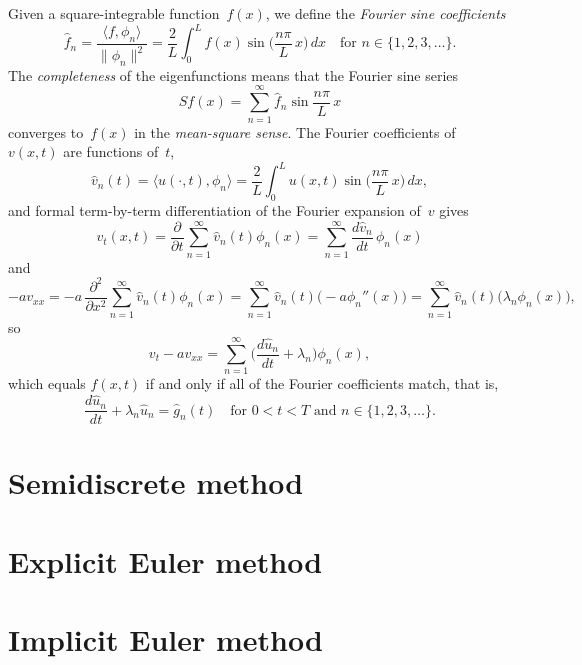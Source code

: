 Given a square-integrable function~$f(x)$, we define the 
\emph{Fourier sine coefficients}
\[
\hat f_n=\frac{\langle f,\phi_n\rangle}{\|\phi_n\|^2}
    =\frac{2}{L}\int_0^Lf(x)\sin\biggl(\frac{n\pi}{L}\,x\biggr)\,dx
    \quad\text{for $n\in\{1,2,3,\ldots\}$.}
\]
The \emph{completeness} of the eigenfunctions means that the Fourier sine series
\[
Sf(x)=\sum_{n=1}^\infty\hat f_n\sin\frac{n\pi}{L}\,x
\]
converges to~$f(x)$ in the \emph{mean-square sense}.  The Fourier coefficients 
of~$v(x,t)$ are functions of~$t$,
\[
\hat v_n(t)=\langle u(\cdot,t),\phi_n\rangle
    =\frac{2}{L}\int_0^Lu(x,t)\sin\biggl(\frac{n\pi}{L}\,x\biggr)\,dx,
\]
and formal term-by-term differentiation of the Fourier expansion of~$v$ gives
\[
v_t(x,t)=\frac{\partial}{\partial t}\sum_{n=1}^\infty\hat v_n(t)\phi_n(x)
    =\sum_{n=1}^\infty\frac{d\hat v_n}{dt}\,\phi_n(x)
\]
and
\[
-av_{xx}=-a\,\frac{\partial^2}{\partial x^2}
    \sum_{n=1}^\infty\hat v_n(t)\phi_n(x)
    =\sum_{n=1}^\infty\hat v_n(t)\bigl(-a\phi_n''(x)\bigr)
    =\sum_{n=1}^\infty\hat v_n(t)\bigl(\lambda_n\phi_n(x)\bigr),
\]
so
\[
v_t-av_{xx}=\sum_{n=1}^\infty\biggl(\frac{d\hat u_n}{dt}+\lambda_n\biggr)
    \phi_n(x),
\]
which equals $f(x,t)$ if and only if all of the Fourier coefficients match, 
that is,
\[
\frac{d\hat u_n}{dt}+\lambda_n\hat u_n=\hat g_n(t)
    \quad\text{for $0<t<T$ and $n\in\{1,2,3,\ldots\}$.}
\]












\section{Semidiscrete method}

\section{Explicit Euler method}

\section{Implicit Euler method}

